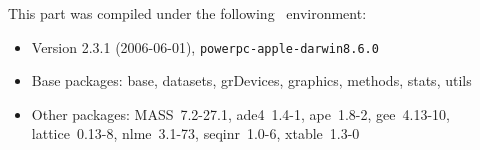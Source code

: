 \documentclass{article}
\begin{document}
This part was compiled under the following \Rlogo{}~environment:

\begin{itemize}
  \item Version 2.3.1 (2006-06-01), \verb|powerpc-apple-darwin8.6.0|
  \item Base packages: base, datasets, grDevices, graphics, methods,
    stats, utils
  \item Other packages: MASS~7.2-27.1, ade4~1.4-1, ape~1.8-2,
    gee~4.13-10, lattice~0.13-8, nlme~3.1-73, seqinr~1.0-6,
    xtable~1.3-0
\end{itemize}


\clearpage
{}


\end{document}
